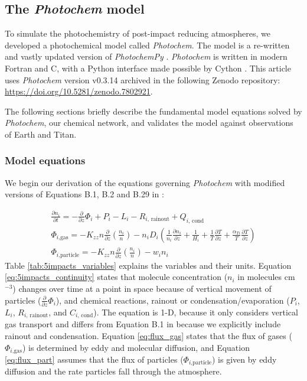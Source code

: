 \subsection{The \emph{Photochem} model} \label{sec:photochem}

To simulate the photochemistry of post-impact reducing atmospheres, we developed a photochemical model called \emph{Photochem}. The model is a re-written and vastly updated version of \emph{PhotochemPy} \citep{Wogan_2022}. \emph{Photochem} is written in modern Fortran and C, with a Python interface made possible by Cython \citep{Behnel_2010}. This article uses \emph{Photochem} version v0.3.14 archived in the following Zenodo repository: \url{https://doi.org/10.5281/zenodo.7802921}.

The following sections briefly describe the fundamental model equations solved by \emph{Photochem}, our chemical network, and validates the model against observations of Earth and Titan.

\subsubsection{Model equations}

We begin our derivation of the equations governing \emph{Photochem} with modified versions of Equations B.1, B.2 and B.29 in \citet{Catling_2017}:

\begin{gather}
  \frac{\partial n_{i}}{\partial t} = - \frac{\partial}{\partial z}\Phi_{i} + P_{i} - L_{i} - R_{i\text{, rainout}} + Q_{i\text{, cond}} \label{eq:5impacts_continuity} 
  \\
  \Phi_{i\text{,gas}} = - K_{zz} n\frac{\partial}{\partial z}\left( \frac{n_{i}}{n} \right) - n_i D_{i} \left( \frac{1}{n_i} \frac{\partial n_i}{\partial z} + \frac{1}{H_i} + \frac{1}{T} \frac{\partial T}{\partial z}  + \frac{\alpha_{Ti}}{T} \frac{\partial T}{\partial z} \right) \label{eq:flux_gas} 
  \\
  \Phi_{i\text{,particle}} = - K_{zz} n\frac{\partial}{\partial z}\left( \frac{n_{i}}{n} \right) - w_i n_i \label{eq:flux_part}
\end{gather}
Table \ref{tab:5impacts_variables} explains the variables and their units. Equation \eqref{eq:5impacts_continuity} states that molecule concentration ($n_i$ in molecules cm$^{-3}$) changes over time at a point in space because of vertical movement of particles ($\frac{\partial}{\partial z}\Phi_{i}$), and chemical reactions, rainout or condensation/evaporation ($P_{i}$, $L_{i}$, $R_{i\text{, rainout}}$, and $C_{i\text{, cond}}$). The equation is 1-D, because it only considers vertical gas transport and differs from Equation B.1 in \citet{Catling_2017} because we explicitly include rainout and condensation. Equation \eqref{eq:flux_gas} states that the flux of gases ($\Phi_{i\text{,gas}}$) is determined by eddy and molecular diffusion, and Equation \eqref{eq:flux_part} assumes that the flux of particles ($\Phi_{i\text{,particle}}$) is given by eddy diffusion and the rate particles fall through the atmosphere.

